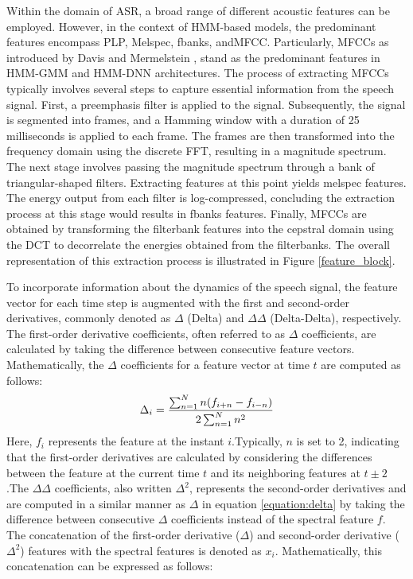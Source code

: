 Within the domain of \ac{ASR}, a broad range of different acoustic features can be employed. However, in the context of \ac{HMM}-based models, the predominant features encompass  \ac{PLP}, Melspec, \ac{fbanks}, and\ac{MFCC}. Particularly, \acp{MFCC} as introduced by Davis and Mermelstein \cite{mfcc}, stand as the predominant features in \ac{HMM-GMM} and \ac{HMM-DNN} architectures.
The process of extracting \acp{MFCC} typically involves several steps to capture essential information from the speech signal. First, a preemphasis filter is applied to the signal. Subsequently, the signal is segmented into frames, and a Hamming window with a duration of 25 milliseconds is applied to each frame. The frames are then transformed into the frequency domain using the discrete \ac{FFT}, resulting in a magnitude spectrum.
The next stage involves passing the magnitude spectrum through a bank of triangular-shaped filters. Extracting features at this point yields melspec features. The energy output from each filter is log-compressed, concluding the extraction process at this stage would results in \ac{fbanks} features. Finally, \acp{MFCC} are obtained by transforming the filterbank features into the cepstral domain using the \ac{DCT} to decorrelate the energies obtained from the filterbanks. The overall representation of this extraction process is illustrated in Figure \ref{feature_block}.


To incorporate information about the dynamics of the speech signal, the feature vector for each time step is augmented with the first and second-order derivatives, commonly denoted as $\Delta$ (Delta) and $\Delta\Delta$ (Delta-Delta), respectively. The first-order derivative coefficients, often referred to as $\Delta$ coefficients, are calculated by taking the difference between consecutive feature vectors. Mathematically, the $\Delta$ coefficients for a feature vector at time $t$ are computed as follows:
\begin{equation}
 \label{equation:delta}
    \Delta_i = \frac{\sum^{N}_{n=1}n(f_{i+n} - f_{i-n})}{2 \sum^N_{n=1}n^2} \\
\end{equation}
Here, $f_i$ represents the feature at the instant $i$.Typically, $n$ is set to 2, indicating that the first-order derivatives are calculated by considering the differences between the feature at the current time $t$ and its neighboring features at $t \pm 2$.The $\Delta\Delta$ coefficients, also written $\Delta^2$, represents the second-order derivatives and are computed in a similar manner as $\Delta$ in equation \ref{equation:delta} by taking the difference between consecutive $\Delta$ coefficients instead of the spectral feature $f$. The concatenation of the first-order derivative ($\Delta$) and second-order derivative ($\Delta^2$) features with the spectral features is denoted as $x_i$. Mathematically, this concatenation can be expressed as follows:

